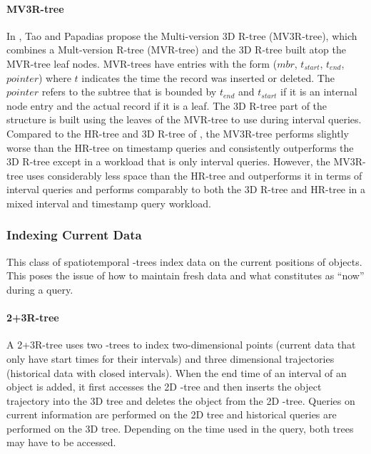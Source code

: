\paragraph{MV3R-tree} In \cite{tao2001mv3r}, Tao and Papadias propose the 
Multi-version 3D R-tree (MV3R-tree), which combines a Mult-version R-tree (MVR-tree) 
and the 3D R-tree\cite{nascimento1999evaluation} built atop the MVR-tree leaf nodes.
MVR-trees have entries with the form ($mbr$, $t_{start}$, $t_{end}$, $pointer$)
where $t$ indicates the time the record was inserted or deleted. The $pointer$ 
refers to the subtree that is bounded by $t_{end}$ and $t_{start}$ if it is an
internal node entry and the actual record if it is a leaf. The 3D R-tree part
of the structure is built using the leaves of the MVR-tree to use during 
interval queries. Compared to the HR-tree and 3D R-tree of 
\cite{nascimento1999evaluation}, the MV3R-tree performs slightly
worse than the HR-tree on timestamp queries and consistently outperforms the 
3D R-tree except in a workload that is only interval queries. However, the 
MV3R-tree uses considerably less space than the HR-tree and outperforms it 
in terms of interval queries and performs comparably to both the 3D R-tree
and HR-tree in a mixed interval and timestamp query workload.

\subsubsection{Indexing Current Data}
This class of spatiotemporal \rbase-trees index data on the current positions of 
objects. This poses the issue of how to maintain fresh data and what constitutes 
as ``now'' during a query. 

\paragraph{2+3R-tree} A 2+3R-tree\cite{nascimento1999evaluation} uses two 
\rbase-trees to index two-dimensional points (current data that only have
start times for their intervals) and three dimensional trajectories 
(historical data with closed intervals). When the end time of an 
interval of an object is added, it first accesses the 2D \rbase-tree
and then inserts the object trajectory into the 3D tree and deletes the 
object from the 2D \rbase-tree. Queries on current information are 
performed on the 2D tree and historical queries are performed on the 3D
tree. Depending on the time used in the query, both trees may have to be 
accessed.

